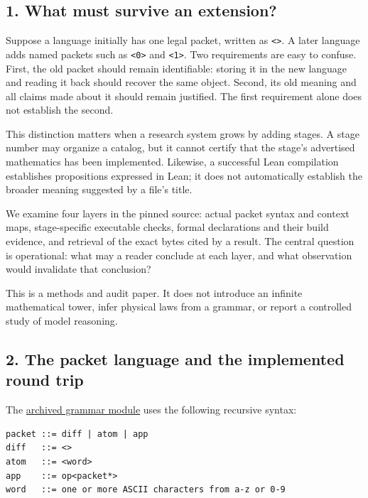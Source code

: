 \documentclass[
  11pt,
]{article}
\newcommand{\passthrough}[1]{#1}
\begin{document}
\hypertarget{what-must-survive-an-extension}{%
\subsection{1. What must survive an
extension?}\label{what-must-survive-an-extension}}

Suppose a language initially has one legal packet, written as
\passthrough{\lstinline!<>!}. A later language adds named packets such
as \passthrough{\lstinline!<0>!} and \passthrough{\lstinline!<1>!}. Two
requirements are easy to confuse. First, the old packet should remain
identifiable: storing it in the new language and reading it back should
recover the same object. Second, its old meaning and all claims made
about it should remain justified. The first requirement alone does not
establish the second.

This distinction matters when a research system grows by adding stages.
A stage number may organize a catalog, but it cannot certify that the
stage's advertised mathematics has been implemented. Likewise, a
successful Lean compilation establishes propositions expressed in Lean;
it does not automatically establish the broader meaning suggested by a
file's title.

We examine four layers in the pinned source: actual packet syntax and
context maps, stage-specific executable checks, formal declarations and
their build evidence, and retrieval of the exact bytes cited by a
result. The central question is operational: what may a reader conclude
at each layer, and what observation would invalidate that conclusion?

This is a methods and audit paper. It does not introduce an infinite
mathematical tower, infer physical laws from a grammar, or report a
controlled study of model reasoning.

\hypertarget{the-packet-language-and-the-implemented-round-trip}{%
\subsection{2. The packet language and the implemented round
trip}\label{the-packet-language-and-the-implemented-round-trip}}

The
\href{../../008_pfp_mssn_tower_challenges_and_retraction_benchmarks/docs/source_archive/mss0_mss1_52cb5457/grammar.py}{archived
grammar module} uses the following recursive syntax:

\begin{lstlisting}
packet ::= diff | atom | app
diff   ::= <>
atom   ::= <word>
app    ::= op<packet*>
word   ::= one or more ASCII characters from a-z or 0-9
\end{lstlisting}
\end{document}
